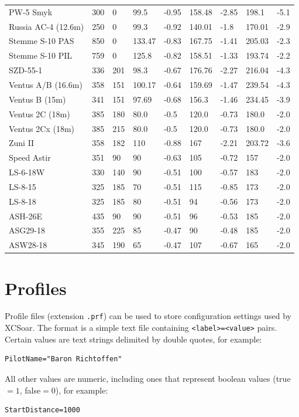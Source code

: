 \documentclass[a4paper,12pt]{refrep}
\begin{document}
\begin{maxipage}
\begin{small}
\begin{longtable}{l l l l l l l l l}
PW-5 Smyk & 300 & 0 & 99.5 & -0.95 & 158.48 & -2.85 & 198.1 & -5.1 \\
Russia AC-4 (12.6m) & 250 & 0 & 99.3 & -0.92 & 140.01 & -1.8 & 170.01 & -2.9 \\
Stemme S-10 PAS & 850 & 0 & 133.47 & -0.83 & 167.75 & -1.41 & 205.03 & -2.3 \\
Stemme S-10 PIL & 759 & 0 & 125.8 & -0.82 & 158.51 & -1.33 & 193.74 & -2.2 \\
SZD-55-1 & 336 & 201 & 98.3 & -0.67 & 176.76 & -2.27 & 216.04 & -4.3 \\
Ventus A/B (16.6m) & 358 & 151 & 100.17 & -0.64 & 159.69 & -1.47 & 239.54 & -4.3 \\
Ventus B (15m) & 341 & 151 & 97.69 & -0.68 & 156.3 & -1.46 & 234.45 & -3.9 \\
Ventus 2C (18m) & 385 & 180 & 80.0 & -0.5 & 120.0 & -0.73 & 180.0 & -2.0 \\
Ventus 2Cx (18m) & 385 & 215 & 80.0 & -0.5 & 120.0 & -0.73 & 180.0 & -2.0 \\
Zuni II & 358 & 182 & 110 & -0.88 & 167 & -2.21 & 203.72 & -3.6 \\
Speed Astir & 351 &  90 &  90 & -0.63 & 105 & -0.72 & 157 & -2.0 \\
LS-6-18W &   330 & 140 &  90 & -0.51 & 100 & -0.57 & 183 & -2.0 \\
LS-8-15 &    325 & 185 &  70 & -0.51 & 115 & -0.85 & 173 & -2.0 \\
LS-8-18 &    325 & 185 &  80 & -0.51 &  94 & -0.56 & 173 & -2.0 \\
ASH-26E &    435 &  90 &  90 & -0.51 &  96 & -0.53 & 185 & -2.0 \\
ASG29-18 &   355 & 225 &  85 & -0.47 &  90 & -0.48 & 185 & -2.0 \\
ASW28-18 &   345 & 190 &  65 & -0.47 & 107 & -0.67 & 165 & -2.0 \\
\bottomrule
\end{longtable}
\end{small}
\end{maxipage}

\section{Profiles}

Profile files (extension \verb|.prf|) can be used to store
configuration settings used by XCSoar.  The format is a simple text
file containing \verb|<label>=<value>| pairs.  Certain values are text
strings delimited by double quotes, for example:
\begin{verbatim}
PilotName="Baron Richtoffen"
\end{verbatim}
All other values are numeric, including ones that represent boolean
values (true$=1$, false$=0$), for example:
\begin{verbatim}
StartDistance=1000
\end{verbatim}
\end{document}
